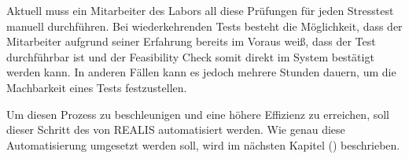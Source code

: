 Aktuell muss ein Mitarbeiter des Labors all diese Prüfungen für jeden Stresstest manuell durchführen. Bei wiederkehrenden Tests besteht die Möglichkeit, dass der Mitarbeiter aufgrund seiner Erfahrung bereits im Voraus weiß, dass der Test durchführbar ist und der Feasibility Check somit direkt im System bestätigt werden kann. In anderen Fällen kann es jedoch mehrere Stunden dauern, um die Machbarkeit eines Tests festzustellen.

Um diesen Prozess zu beschleunigen und eine höhere Effizienz zu erreichen, soll dieser Schritt des  von \gls{REALIS} automatisiert werden. Wie genau diese Automatisierung umgesetzt werden soll, wird im nächsten Kapitel () beschrieben.
